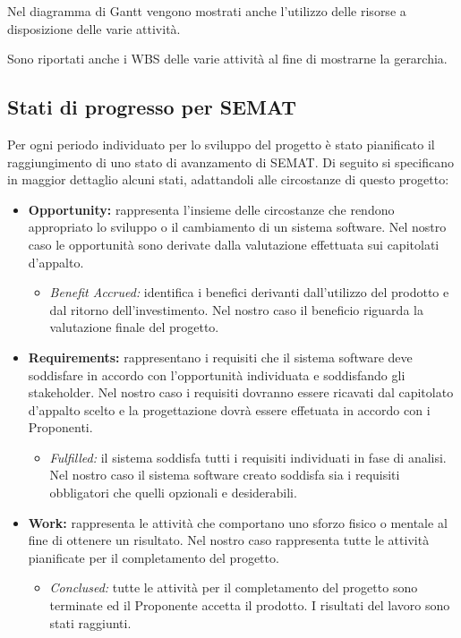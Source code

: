 \noindent Nel diagramma di \gls{Gantt} vengono mostrati anche l'utilizzo delle risorse a disposizione delle varie attività.

\noindent Sono riportati anche i \gls{WBS} delle varie attività al fine di mostrarne la gerarchia.

\subsection{Stati di progresso per SEMAT}
Per ogni periodo individuato per lo sviluppo del progetto \PROGETTO{} è stato pianificato il raggiungimento di uno stato di avanzamento di SEMAT. Di seguito si specificano in maggior dettaglio alcuni stati, adattandoli alle circostanze di questo progetto:
\begin{itemize}
	\item \textbf{Opportunity:} rappresenta l'insieme delle circostanze che rendono appropriato lo sviluppo o il cambiamento di un sistema software. Nel nostro caso le opportunità sono derivate dalla valutazione effettuata sui capitolati d'appalto.
	\begin{itemize}
		\item \textit{Benefit Accrued:} identifica i benefici derivanti dall'utilizzo del prodotto e dal ritorno dell'investimento. Nel nostro caso il beneficio riguarda la valutazione finale del progetto.
	\end{itemize}
	\item \textbf{Requirements:} rappresentano i requisiti che il sistema software deve soddisfare in accordo con l'opportunità individuata e soddisfando gli stakeholder. Nel nostro caso i requisiti dovranno essere ricavati dal capitolato d'appalto scelto e la progettazione dovrà essere effetuata in accordo con i Proponenti.
	\begin{itemize}
		\item \textit{Fulfilled:} il sistema soddisfa tutti i requisiti individuati in fase di analisi. Nel nostro caso il sistema software creato soddisfa sia i requisiti obbligatori che quelli opzionali e desiderabili.
	\end{itemize}
	\item \textbf{Work:} rappresenta le attività che comportano uno sforzo fisico o mentale al fine di ottenere un risultato. Nel nostro caso rappresenta tutte le attività pianificate per il completamento del progetto.
	\begin{itemize}
		\item \textit{Conclused:} tutte le attività per il completamento del progetto sono terminate ed il Proponente accetta il prodotto. I risultati del lavoro sono stati raggiunti.
	\end{itemize}
\end{itemize}

